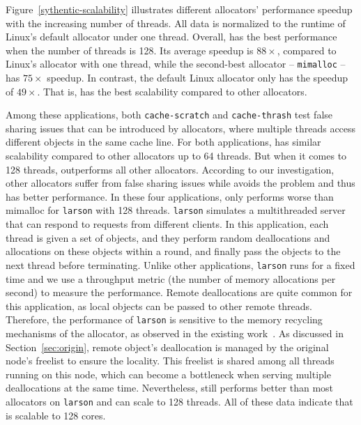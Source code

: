 Figure~\ref{sythentic-scalability} illustrates different allocators' performance speedup with the increasing number of threads. All data is normalized to the runtime of Linux's default allocator under one thread. Overall, \NM{} has the best performance when the number of threads is 128. Its average speedup is $88\times$, compared to Linux's allocator with one thread, while the second-best allocator -- \texttt{mimalloc} -- has $75\times$ speedup. In contrast, the default Linux allocator only has the speedup of $49\times$. That is, \NM{} has the best scalability compared to other allocators.

Among these applications, both \texttt{cache-scratch} and \texttt{cache-thrash} test false sharing issues that can be introduced by allocators, where multiple threads access different objects in the same cache line. For both applications, \NM{} has similar scalability compared to other allocators up to 64 threads. But when it comes to 128 threads, \NM{} outperforms all other allocators. According to our investigation, other allocators suffer from false sharing issues while \NM{} avoids the problem and thus has better performance.
In these four applications, \NM{} only performs worse than mimalloc for \texttt{larson} with 128 threads. \texttt{larson} simulates a multithreaded server that can respond to requests from different clients. In this application, each thread is given a set of objects, and they perform random deallocations and allocations on these objects within a round, and finally pass the objects to the next thread before terminating. Unlike other applications, \texttt{larson} runs for a fixed time and we use a throughput metric (the number of memory allocations per second) to measure the performance. Remote deallocations are quite common for this application, as local objects can be passed to other remote threads. Therefore, the performance of \texttt{larson} is sensitive to the memory recycling mechanisms of the allocator, as observed in the existing work~\cite{Scalloc, scalableallocator}. As discussed in Section~\ref{sec:origin}, remote object's deallocation is managed by the original node's freelist to ensure the locality. This freelist is shared among all threads running on this node, which can become a bottleneck when serving multiple deallocations at the same time. Nevertheless, \NM{} still performs better than most allocators on \texttt{larson} and can scale to 128 threads.
All of these data indicate that \NM{} is scalable to 128 cores. 

